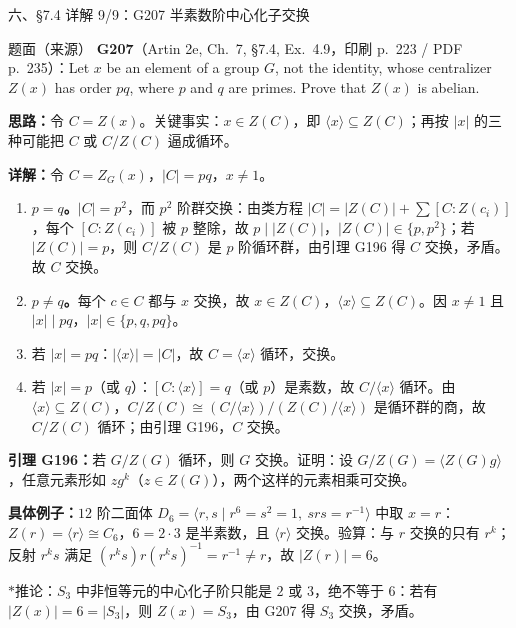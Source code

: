 \documentclass[aspectratio=169,10pt,fontset=none]{ctexbeamer}
\newcommand{\ex}[1]{\textcolor{accent}{\footnotesize\bfseries #1}}
\newcommand{\key}[1]{\textcolor{ink}{\bfseries #1}}
\newcommand{\starpt}{\textcolor{accent}{\bfseries$\ast$}}
\begin{document}
\begin{frame}[t]{六、\S7.4 详解 9/9：G207 半素数阶中心化子交换}
\label{ex:G207}
\scriptsize
\begin{block}{\footnotesize 题面（来源）}
\ex{G207}（Artin 2e, Ch.~7, \S7.4, Ex.~4.9，印刷 p.~223 / PDF p.~235）：Let $x$ be an element of a group $G$, not the identity, whose centralizer $Z(x)$ has order $pq$, where $p$ and $q$ are primes. Prove that $Z(x)$ is abelian.
\end{block}
\key{思路：}令 $C=Z(x)$。关键事实：$x\in Z(C)$，即 $\langle x\rangle\subseteq Z(C)$；再按 $|x|$ 的三种可能把 $C$ 或 $C/Z(C)$ 逼成循环。

\key{详解：}令 $C=Z_G(x)$，$|C|=pq$，$x\ne1$。
\begin{enumerate}\setlength{\itemsep}{1pt}
\item \textbf{$p=q$。}$|C|=p^2$，而 $p^2$ 阶群交换：由类方程 $|C|=|Z(C)|+\sum[C:Z(c_i)]$，每个 $[C:Z(c_i)]$ 被 $p$ 整除，故 $p\mid|Z(C)|$，$|Z(C)|\in\{p,p^2\}$；若 $|Z(C)|=p$，则 $C/Z(C)$ 是 $p$ 阶循环群，由引理 G196 得 $C$ 交换，矛盾。故 $C$ 交换。
\item \textbf{$p\ne q$。}每个 $c\in C$ 都与 $x$ 交换，故 $x\in Z(C)$，$\langle x\rangle\subseteq Z(C)$。因 $x\ne1$ 且 $|x|\mid pq$，$|x|\in\{p,q,pq\}$。
\item 若 $|x|=pq$：$|\langle x\rangle|=|C|$，故 $C=\langle x\rangle$ 循环，交换。
\item 若 $|x|=p$（或 $q$）：$[C:\langle x\rangle]=q$（或 $p$）是素数，故 $C/\langle x\rangle$ 循环。由 $\langle x\rangle\subseteq Z(C)$，$C/Z(C)\cong(C/\langle x\rangle)/(Z(C)/\langle x\rangle)$ 是循环群的商，故 $C/Z(C)$ 循环；由引理 G196，$C$ 交换。
\end{enumerate}
\key{引理 G196：}若 $G/Z(G)$ 循环，则 $G$ 交换。证明：设 $G/Z(G)=\langle Z(G)g\rangle$，任意元素形如 $zg^k$（$z\in Z(G)$），两个这样的元素相乘可交换。

\key{具体例子：}$12$ 阶二面体 $D_6=\langle r,s\mid r^6=s^2=1,\ srs=r^{-1}\rangle$ 中取 $x=r$：$Z(r)=\langle r\rangle\cong C_6$，$6=2\cdot3$ 是半素数，且 $\langle r\rangle$ 交换。验算：与 $r$ 交换的只有 $r^k$；反射 $r^ks$ 满足 $(r^ks)r(r^ks)^{-1}=r^{-1}\ne r$，故 $|Z(r)|=6$。

\starpt 推论：$S_3$ 中非恒等元的中心化子阶只能是 $2$ 或 $3$，绝不等于 $6$：若有 $|Z(x)|=6=|S_3|$，则 $Z(x)=S_3$，由 G207 得 $S_3$ 交换，矛盾。
\end{frame}

\end{document}
